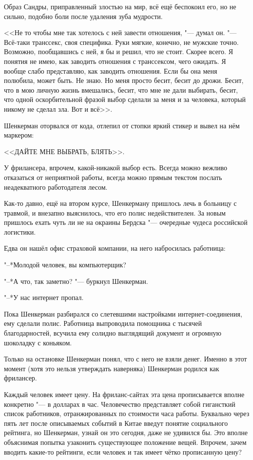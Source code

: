 Образ Сандры, приправленный злостью на мир, всё ещё беспокоил его, но не сильно, подобно боли после удаления зуба мудрости.

<<Не то чтобы мне так хотелось с ней завести отношения, "--- думал он.
"--- Всё-таки транссекс, своя специфика.
Руки мягкие, конечно, не мужские точно.
Возможно, пообщавшись с ней, я бы и решил, что не стоит.
Скорее всего.
Я понятия не имею, как заводить отношения с транссексом, чего ожидать.
Я вообще слабо представляю, как заводить отношения.
Если бы она меня полюбила, может быть.
Не знаю.
Но меня просто бесит, бесит до дрожи.
Бесит, что в мою личную жизнь вмешались, бесит, что мне не дали выбирать, бесит, что одной оскорбительной фразой выбор сделали за меня и за человека, который никому не сделал зла.
Вот и всё>>.

Шенкерман оторвался от кода, отлепил от стопки яркий стикер и вывел на нём маркером:

<<ДАЙТЕ МНЕ ВЫБРАТЬ, БЛЯТЬ>>.

У фрилансера, впрочем, какой-никакой выбор есть.
Всегда можно вежливо отказаться от неприятной работы, всегда можно прямым текстом послать неадекватного работодателя лесом.

Как-то давно, ещё на втором курсе, Шенкерману пришлось лечь в больницу с травмой, и внезапно выяснилось, что его полис недействителен.
За новым пришлось ехать чуть ли не на окраины Бердска "--- очередные чудеса российской логистики.

Едва он нашёл офис страховой компании, на него набросилась работница:

"--*Молодой человек, вы компьютерщик?

"--*А что, так заметно? "--- буркнул Шенкерман.

"--*У нас интернет пропал.

Пока Шенкерман разбирался со слетевшими настройками интернет-соединения, ему сделали полис.
Работница выпроводила помощника с тысячей благодарностей, всучила ему солидно выглядящий документ и огромную шоколадку с коньяком.

Только на остановке Шенкерман понял, что с него не взяли денег.
Именно в этот момент (хотя это нельзя утверждать наверняка) Шенкерман родился как фрилансер.

Каждый человек имеет цену.
На фриланс-сайтах эта цена прописывается вполне конкретно "--- в долларах в час.
Человечество представляет собой гигансткий список работников, отранжированных по стоимости часа работы.
Буквально через пять лет после описываемых событий в Китае введут понятие социального рейтинга, но Шенкерман, узнай он это сегодня, даже не удивился бы.
Это вполне объяснимая попытка узаконить существующее положение вещей.
Впрочем, зачем вводить какие-то рейтинги, если человек и так имеет чётко прописанную цену?


